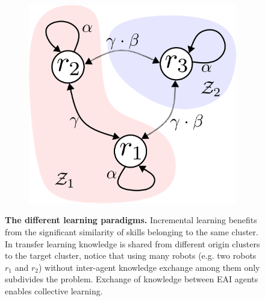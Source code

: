 \documentclass[12pt]{article}
\begin{document}
\begin{figure}[!t]
\begin{subfigure}[t]{0.32\textwidth}
	\end{subfigure}
	\hfill
	\begin{subfigure}[t]{0.32\textwidth}
		\subcaption{}
		\includegraphics[width=\textwidth]{cl_example_figure.png} \label{fig:cl_example_figure}
	\end{subfigure}	
	\hspace*{\fill}
	\caption[] {\label{fig:learning_paradigms_conceptual_figure} \textbf{The different learning paradigms.}  Incremental learning benefits from the significant similarity of skills belonging to the same cluster.  In transfer learning knowledge is shared from different origin clusters to the target cluster, notice that using many robots (e.g. two robots $r_1$ and $r_2$) without inter-agent knowledge exchange among them only subdivides the problem.  Exchange of knowledge between EAI agents enables collective learning.}
\end{figure}
\end{document}
